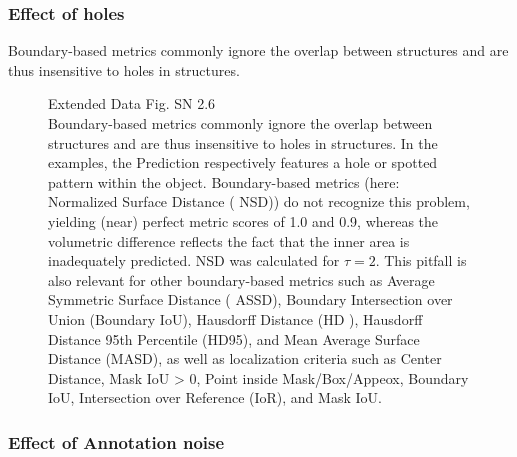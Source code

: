 \documentclass[11pt]{article}
\begin{document}
\subsubsection{Effect of holes}

Boundary-based metrics commonly ignore the overlap between structures and are thus insensitive to holes in structures.

\begin{figure}[H]
    \centering
    \caption{Extended Data Fig. SN 2.6~\cite{pitfalls-in-segmentation-evaluation}\\
    Boundary-based metrics commonly ignore the overlap between structures
and are thus insensitive to holes in structures. In the examples, the Prediction respectively features
a hole or spotted pattern within the object. Boundary-based metrics (here: Normalized Surface
Distance ( NSD)) do not recognize this problem, yielding (near) perfect metric scores of 1.0 and 0.9,
whereas the volumetric difference reflects the fact that the inner area is inadequately predicted.
NSD was calculated for $\tau = 2$. This pitfall is also relevant for other boundary-based metrics such
as Average Symmetric Surface Distance ( ASSD), Boundary Intersection over Union (Boundary IoU),
Hausdorff Distance (HD ), Hausdorff Distance 95th Percentile (HD95), and Mean Average Surface
Distance (MASD), as well as localization criteria such as Center Distance, Mask IoU > 0, Point inside
Mask/Box/Appeox, Boundary IoU, Intersection over Reference (IoR), and Mask IoU.}
\end{figure}

\subsubsection{Effect of Annotation noise}
\end{document}
